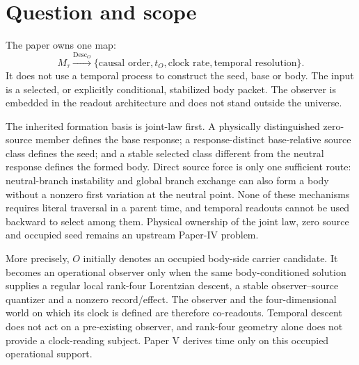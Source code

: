 \documentclass[11pt]{article}
\begin{document}
\begin{center}
\end{center}

\section{Question and scope}

The paper owns one map:
\begin{equation}
 M_\tau\xrightarrow{\operatorname{Desc}_O}
 \{\text{causal order},t_O,\text{clock rate},\text{temporal resolution}\}.
 \label{eq:target}
\end{equation}
It does not use a temporal process to construct the seed, base or body. The
input is a selected, or explicitly conditional, stabilized body packet. The
observer is embedded in the readout architecture and does not stand outside
the universe.

The inherited formation basis is joint-law first.  A physically distinguished
zero-source member defines the base response; a response-distinct
base-relative source class defines the seed; and a stable selected class
different from the neutral response defines the formed body.  Direct source
force is only one sufficient route: neutral-branch instability and global
branch exchange can also form a body without a nonzero first variation at the
neutral point.  None of these mechanisms requires literal traversal in a
parent time, and temporal readouts cannot be used backward to select among
them.  Physical ownership of the joint law, zero source and occupied seed
remains an upstream Paper-IV problem.

More precisely, $O$ initially denotes an occupied body-side carrier
candidate.  It becomes an operational observer only when the same
body-conditioned solution supplies a regular local rank-four Lorentzian
descent, a stable observer--source quantizer and a nonzero record/effect.  The
observer and the four-dimensional world on which its clock is defined are
therefore co-readouts.  Temporal descent does not act on a pre-existing
observer, and rank-four geometry alone does not provide a clock-reading
subject.  Paper V derives time only on this occupied operational support.
\end{document}
